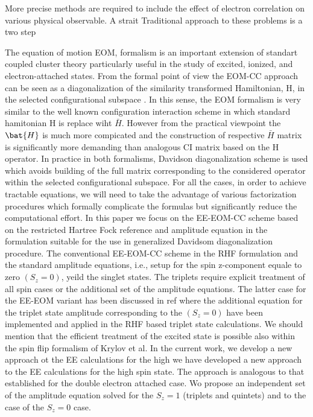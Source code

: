 More precise methods are required to include the effect of electron correlation on various physical observable. A strait
Traditional approach to these problems is a two step 


 

The equation of motion EOM, formalism  is an important extension of standart coupled cluster theory particularly useful in the study of excited, ionized, and electron-attached  states.  From the formal point of view the EOM-CC approach can be seen as a diagonalization of the similarity transformed  Hamiltonian, H,  in the selected configurational subspace . In this sense, the EOM formalism is very similar to the well known configuration interaction scheme in which standard hamitonian H is replace wiht \(\bar{H}\). However from the practical viewpoint the  \(\bat{H}\) is much more compicated and the construction of respective \(\bar{H}\) matrix is significantly more demanding than analogous CI matrix based on the H operator.  In practice  in both formalisms,  Davidson diagonalization  scheme is used which avoids building of the full matrix corresponding  to the considered operator within the selected configurational subspace. For all the cases, in order to achieve tractable equations, we will need to take the advantage of various factorization procedures which  formally complicate the formulas but significantly reduce the computational effort. In this paper we focus on the EE-EOM-CC  scheme based on the restricted  Hartree Fock reference and  amplitude equation in the formulation suitable for the use in generalized  Davidsom diagonalization procedure.  The conventional EE-EOM-CC scheme in the RHF formulation and the standard amplitude equations, i.e.,  setup for the spin z-component equale to zero \((S_{z} = 0)\), yeild the singlet states. The triplets  require explicit treatment of all spin cases or the additional set of the amplitude equations.  The latter case for the EE-EOM variant has been discussed in ref where the additional equation for the triplet state amplitude corresponding to the \((S_{z} = 0)\) have been implemented and applied in the RHF based triplet state calculations. We should mention that the efficient treatment of the excited state is possible also within the spin flip formalism of Krylov et al. In the current work, we develop a new approach ot the EE calculations for the high we have developed a new approach to the EE calculations for the high spin state. The approach is analogous to that established for the double electron attached case. Wo propose an independent set of the amplitude equation solved for the \(S_{z} =1 \)  (triplets and quintets) and to the case of the \(S_{z} = 0\) case.

